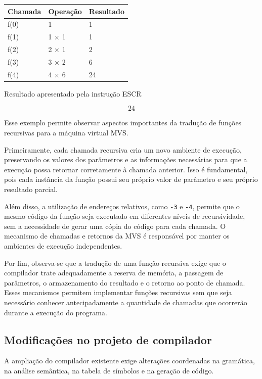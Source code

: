 \documentclass[
  brazilian,
  letterpaper,
]{book}
\theoremstyle{plain}
\theoremstyle{definition}
\theoremstyle{remark}
\begin{document}
\begin{longtable*}[]{|l|l|l|}
\toprule\noalign{}
Chamada & Operação & Resultado \\
\midrule\noalign{}
\endhead
\bottomrule\noalign{}
\endlastfoot
f(0) & 1 & 1 \\
\midrule
f(1) & 1 × 1 & 1 \\
\midrule
f(2) & 2 × 1 & 2 \\
\midrule
f(3) & 3 × 2 & 6 \\
\midrule
f(4) & 4 × 6 & 24 \\
\end{longtable*}

Resultado apresentado pela instrução ESCR

\[24\]

Esse exemplo permite observar aspectos importantes da tradução de
funções recursivas para a máquina virtual MVS.

Primeiramente, cada chamada recursiva cria um novo ambiente de execução,
preservando os valores dos parâmetros e as informações necessárias para
que a execução possa retornar corretamente à chamada anterior. Isso é
fundamental, pois cada instância da função possui seu próprio valor de
parâmetro e seu próprio resultado parcial.

Além disso, a utilização de endereços relativos, como \texttt{-3} e
\texttt{-4}, permite que o mesmo código da função seja executado em
diferentes níveis de recursividade, sem a necessidade de gerar uma cópia
do código para cada chamada. O mecanismo de chamadas e retornos da MVS é
responsável por manter os ambientes de execução independentes.

Por fim, observa-se que a tradução de uma função recursiva exige que o
compilador trate adequadamente a reserva de memória, a passagem de
parâmetros, o armazenamento do resultado e o retorno ao ponto de
chamada. Esses mecanismos permitem implementar funções recursivas sem
que seja necessário conhecer antecipadamente a quantidade de chamadas
que ocorrerão durante a execução do programa.

\subsection{Modificações no projeto de
compilador}\label{modificauxe7uxf5es-no-projeto-de-compilador}

A ampliação do compilador existente exige alterações coordenadas na
gramática, na análise semântica, na tabela de símbolos e na geração de
código.
\end{document}
